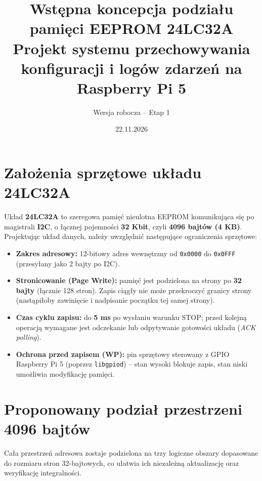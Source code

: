 \documentclass[11pt, a4paper]{article}
\title{\textbf{\color{accent}Wstępna koncepcja podziału pamięci EEPROM 24LC32A}\\
\large Projekt systemu przechowywania konfiguracji i logów zdarzeń na Raspberry Pi 5}
\author{Wersja robocza -- Etap 1}
\date{22.11.2026}
\begin{document}
\maketitle

\section{Założenia sprzętowe układu 24LC32A}
Układ \textbf{24LC32A} to szeregowa pamięć nieulotna EEPROM komunikująca się po magistrali \textbf{I2C}, o łącznej pojemności \textbf{32 Kbit}, czyli \textbf{4096 bajtów (4 KB)}. Projektując układ danych, należy uwzględnić następujące ograniczenia sprzętowe:

\begin{itemize}
    \item \textbf{Zakres adresowy:} 12-bitowy adres wewnętrzny od \texttt{0x0000} do \texttt{0x0FFF} (przesyłany jako 2 bajty po I2C).
    \item \textbf{Stronicowanie (Page Write):} pamięć jest podzielona na strony po \textbf{32 bajty} (łącznie 128 stron). Zapis ciągły nie może przekroczyć granicy strony (nastąpiłoby zawinięcie i nadpisanie początku tej samej strony).
    \item \textbf{Czas cyklu zapisu:} do \textbf{5 ms} po wysłaniu warunku STOP; przed kolejną operacją wymagane jest odczekanie lub odpytywanie gotowości układu (\textit{ACK polling}).
    \item \textbf{Ochrona przed zapisem (WP):} pin sprzętowy sterowany z GPIO Raspberry Pi 5 (poprzez \texttt{libgpiod}) -- stan wysoki blokuje zapis, stan niski umożliwia modyfikację pamięci.
\end{itemize}

\section{Proponowany podział przestrzeni 4096 bajtów}
Cała przestrzeń adresowa zostaje podzielona na trzy logiczne obszary dopasowane do rozmiaru stron 32-bajtowych, co ułatwia ich niezależną aktualizację oraz weryfikację integralności.
\end{document}
